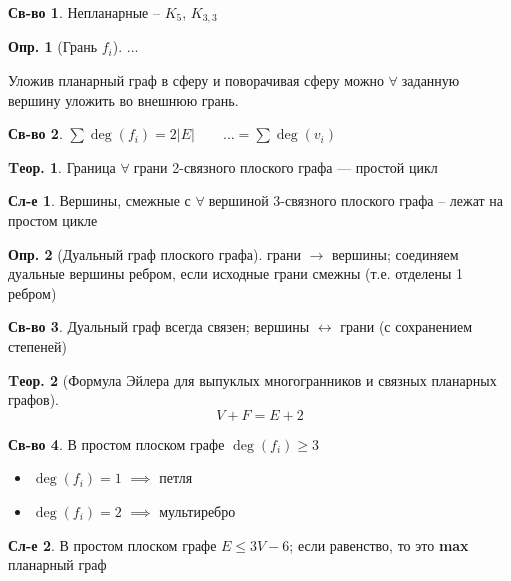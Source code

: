 \documentclass[a4paper,12pt]{article}
\theoremstyle{definition}
\newtheorem{definition}{Опр.}[section]
\newtheorem*{property}{Св-во}  %
\theoremstyle{definition}
\newtheorem{theorem}{Tеор.}[section]
\newtheorem*{corollary}{Сл-е} %
\def\iiany{$\forall\;$}
\begin{document}
\begin{property} Непланарные -- $K_5$, $K_{3,3}$ \end{property}

\begin{definition}[Грань $f_i$] ... \end{definition}

Уложив планарный граф в сферу и поворачивая сферу можно \iiany заданную вершину уложить во внешнюю грань.

\begin{property} $ \sum{\deg(f_i)} = 2|E| \qquad ... = \sum{\deg(v_i)}$ \end{property}

\begin{theorem}	Граница \iiany грани 2-связного плоского графа --- простой цикл \end{theorem}

\begin{corollary}
	Вершины, смежные с \iiany вершиной 3-связного плоского графа -- лежат на простом цикле
\end{corollary}

\begin{definition}[Дуальный граф плоского графа]
	грани $\longrightarrow$ вершины; соединяем дуальные вершины ребром, если исходные грани смежны (т.е. отделены 1 ребром)
\end{definition}

\begin{property}
	Дуальный граф всегда связен; вершины $\longleftrightarrow$ грани (с сохранением степеней)
\end{property}

\begin{theorem}[Формула Эйлера для выпуклых многогранников и связных планарных графов]
	\[ V+F = E+2 \]
\end{theorem}

\begin{property}
	В простом плоском графе $\deg(f_i) \geqslant 3$
	\begin{itemize}
		\item $\deg(f_i)=1$ $\implies$ петля
		\item $\deg(f_i)=2$ $\implies$ мультиребро
	\end{itemize}
\end{property}

\begin{corollary}
	В простом плоском графе $E \leqslant 3V-6$; если равенство, то это \textbf{max} планарный граф
\end{corollary}
\end{document}
